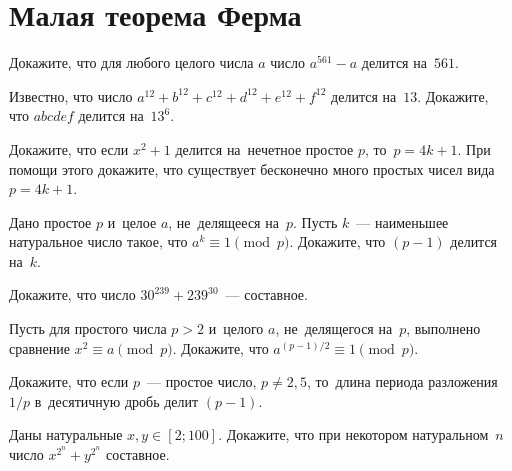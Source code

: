 
\section*{Малая теорема Ферма}


\begin{problems}

\item
Докажите, что для любого целого числа $a$ число $a^{561} - a$ делится на~$561$.

\item
Известно, что число $a^{12} + b^{12} + c^{12} + d^{12} + e^{12} + f^{12}$
делится на~$13$.
Докажите, что $a b c d e f$ делится на~$13^{6}$.

\item
Докажите, что если $x^2 + 1$ делится на~нечетное простое $p$, то~$p = 4k + 1$.
При помощи этого докажите, что существует бесконечно много простых чисел вида
$p = 4k + 1$.

\item
Дано простое $p$ и~целое $a$, не~делящееся на~$p$.
Пусть $k$~--- наименьшее натуральное число такое, что $a^k \equiv 1 \pmod{p}$.
Докажите, что $(p - 1)$ делится на~$k$.

\item
Докажите, что число $30^{239} + 239^{30}$~--- составное.

\item
Пусть для простого числа $p > 2$ и~целого $a$, не~делящегося на~$p$,
выполнено сравнение $x^2 \equiv a \pmod p$.
Докажите, что $a^{(p-1)/2} \equiv 1 \pmod p$.

\item
Докажите, что если $p$~--- простое число, $p \neq 2, 5$, то~длина периода
разложения $1 / p$ в~десятичную дробь делит $(p - 1)$.

\item
Даны натуральные $x, y \in [2; 100]$.
Докажите, что при некотором натуральном~$n$ число $x^{2^n} + y^{2^n}$ составное.

\end{problems}

